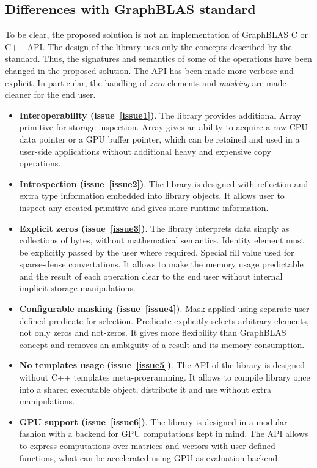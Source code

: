 \subsection{Differences with GraphBLAS standard}

To be clear, the proposed solution is not an implementation of GraphBLAS C or C++ API. The design of the library uses only the concepts described by the standard. Thus, the signatures and semantics of some of the operations have been changed in the proposed solution. The API has been made more verbose and explicit. In particular, the handling of \textit{zero} elements and \textit{masking} are made cleaner for the end user.   

\begin{itemize}
    \item \textbf{Interoperability (issue~\ref{issue1})}. The library provides additional Array primitive for storage inspection. Array gives an ability to acquire a raw CPU data pointer or a GPU buffer pointer, which can be retained and used in a user-side applications without additional heavy and expensive copy operations.
    \item \textbf{Introspection (issue~\ref{issue2})}. The library is designed with reflection and extra type information embedded into library objects. It allows user to inspect any created primitive and gives more runtime information. 
    \item \textbf{Explicit zeros (issue~\ref{issue3})}. The library interprets data simply as collections of bytes, without mathematical semantics. Identity element must be explicitly passed by the user where required. Special fill value used for sparse-dense convertations. It allows to make the memory usage predictable and the result of each operation clear to the end user without internal implicit storage manipulations.
    \item \textbf{Configurable masking (issue~\ref{issue4})}. Mask applied using separate user-defined predicate for selection. Predicate explicitly selects arbitrary elements, not only zeros and not-zeros. It gives more flexibility than GraphBLAS concept and removes an ambiguity of a result and its memory consumption.
    \item \textbf{No templates usage (issue~\ref{issue5})}. The API of the library is designed without C++ templates meta-programming. It allows to compile library once into a shared executable object, distribute it and use without extra manipulations.
    \item \textbf{GPU support (issue~\ref{issue6})}. The library is designed in a modular fashion with a backend for GPU computations kept in mind. The API allows to express computations over matrices and vectors with user-defined functions, what can be accelerated using GPU as evaluation backend.
\end{itemize}